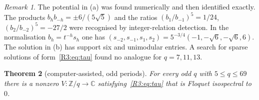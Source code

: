 \documentclass[11pt]{amsart}
\newtheorem{theorem}{Theorem}[section]
\theoremstyle{definition}
\theoremstyle{remark}
\newtheorem{remark}[theorem]{Remark}
\providecommand{\C}{\mathbb C}
\providecommand{\Z}{\mathbb Z}
\begin{document}
\begin{remark}
The potential in (a) was found numerically and then identified exactly. The
products $b_hb_{-h}=\pm6/(5\sqrt5)$ and the ratios $(b_1/b_{-1})^5=1/24$,
$(b_2/b_{-2})^5=-27/2$ were recognised by integer-relation detection. In
the normalisation $b_h=t^{-h}s_h$ one has
$(s_{-2},s_{-1},s_1,s_2)=5^{-3/4}(-1,-\sqrt6,-\sqrt6,6)$. The solution in (b) has
support six and unimodular entries. A search for sparse solutions of
form~\eqref{R3:eq:tau} found no analogue for $q=7,11,13$.
\end{remark}

\begin{theorem}[computer-assisted, odd periods]\label{R3:thm:certified}
For every odd $q$ with $5\le q\le69$ there is a nonzero $V:\Z/q\to\C$
satisfying~\eqref{R3:eq:tau} that is Floquet isospectral to $0$.
\end{theorem}
\end{document}
